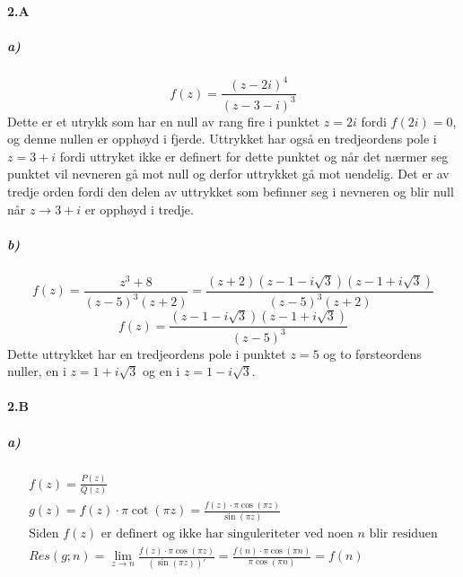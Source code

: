 \documentclass[11pt, A4paper,norsk]{article}
\begin{document}
\clearpage
		\paragraph{2.A}
			\subparagraph{a)}
				\begin{flushleft}
$$f(z) = \frac{(z - 2i)^4}{(z - 3 - i)^3}$$
Dette er et utrykk som har en null av rang fire i punktet $z = 2i$ fordi $f(2i) = 0$, og denne nullen er opphøyd i fjerde. Uttrykket har også en tredjeordens pole i $z = 3 + i$ fordi uttryket ikke er definert for dette punktet og når det nærmer seg punktet vil nevneren gå mot null og derfor uttrykket gå mot uendelig. Det er av tredje orden fordi den delen av uttrykket som befinner seg i nevneren og blir null når $z \rightarrow 3 + i$ er opphøyd i tredje.
				\end{flushleft}









			\subparagraph{b)}
				\begin{flushleft}
$$f(z) = \frac{z^3 + 8}{(z - 5)^3(z + 2)} = \frac{(z + 2)(z - 1 - i\sqrt{3})(z - 1 + i\sqrt{3})}{(z - 5)^3(z + 2)}$$
$$f(z) = \frac{(z - 1 - i\sqrt{3})(z - 1 + i\sqrt{3})}{(z - 5)^3}$$
Dette uttrykket har en tredjeordens pole i punktet $z = 5$ og to førsteordens nuller, en i $z = 1 + i \sqrt{3}$ og en i $z = 1 - i \sqrt{3}$.
				\end{flushleft}
			








		\paragraph{2.B}
			\subparagraph{a)}
				\begin{gather*}
f(z) = \frac{P(z)}{Q(z)} \\
g(z) = f(z) \cdot \pi \cot(\pi z) = \frac{f(z) \cdot \pi \cos(\pi z)}{\sin(\pi z)} \\
\text{Siden $f(z)$ er definert og ikke har singuleriteter ved noen $n$ blir residuen} \\
Res(g; n) = \lim_{z \rightarrow n} \frac{f(z) \cdot \pi \cos(\pi z)}{(\sin(\pi z))'} = \frac{f(n) \cdot \pi \cos(\pi n)}{\pi \cos(\pi n)} = f(n)
				\end{gather*}
\end{document}
